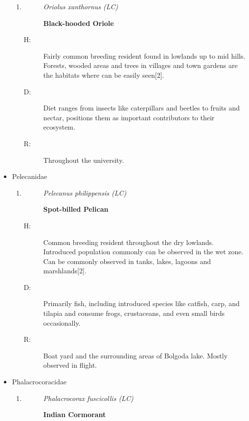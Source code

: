 \begin{itemize}
\begin{enumerate}
\item%
\begin{description}%
\item[]%
\textit{Oriolus xanthornus (LC)}%
\item[]%
\textbf{Black{-}hooded Oriole}%
\end{description}%
\begin{description}%
\item[H: ]%
Fairly common breeding resident found in lowlands up to mid hills. Forests, wooded areas and trees in villages and town gardens are the habitats where can be easily seen{[}2{]}.%
\item[D: ]%
Diet ranges from insects like caterpillars and beetles to fruits and nectar, positions them as important contributors to their ecosystem.%
\item[R: ]%
Throughout the university.%
\end{description}%
\end{enumerate}%
\item%
Pelecanidae%
\begin{enumerate}%
\item%
\begin{description}%
\item[]%
\textit{Pelecanus philippensis (LC)}%
\item[]%
\textbf{Spot{-}billed Pelican}%
\end{description}%
\begin{description}%
\item[H: ]%
Common breeding resident throughout the dry lowlands. Introduced population commonly can be observed in the wet zone.  Can be commonly observed in tanks, lakes, lagoons and marshlands{[}2{]}.%
\item[D: ]%
Primarily fish, including introduced species like catfish, carp, and tilapia and consume frogs, crustaceans, and even small birds occasionally.%
\item[R: ]%
Boat yard and the surrounding areas of Bolgoda lake. Mostly observed in flight.%
\end{description}%
\end{enumerate}%
\item%
Phalacrocoracidae%
\begin{enumerate}%
\item%
\begin{description}%
\item[]%
\textit{Phalacrocorax fuscicollis (LC)}%
\item[]%
\textbf{Indian Cormorant}%

\end{description}
\end{enumerate}
\end{itemize}
